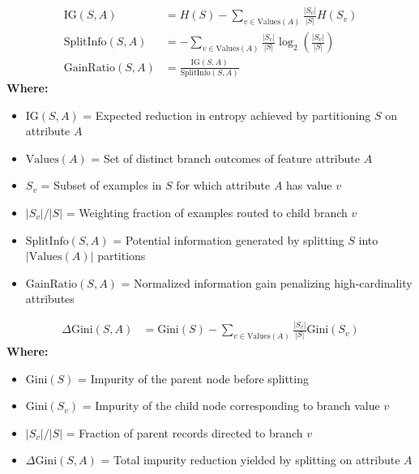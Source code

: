 \begin{formulabox}
\begin{align*}
    \text{IG}(S, A) &= H(S) - \sum_{v \in \text{Values}(A)} \frac{|S_v|}{|S|} H(S_v) \\[2pt]
    \text{SplitInfo}(S, A) &= - \sum_{v \in \text{Values}(A)} \frac{|S_v|}{|S|} \log_2\left(\frac{|S_v|}{|S|}\right) \\[2pt]
    \text{GainRatio}(S, A) &= \frac{\text{IG}(S, A)}{\text{SplitInfo}(S, A)}
\end{align*}
\textbf{Where:}
\begin{itemize}[noitemsep, topsep=1pt]
    \item $\text{IG}(S, A)$ = Expected reduction in entropy achieved by partitioning $S$ on attribute $A$
    \item $\text{Values}(A)$ = Set of distinct branch outcomes of feature attribute $A$
    \item $S_v$ = Subset of examples in $S$ for which attribute $A$ has value $v$
    \item $|S_v| / |S|$ = Weighting fraction of examples routed to child branch $v$
    \item $\text{SplitInfo}(S, A)$ = Potential information generated by splitting $S$ into $| \text{Values}(A) |$ partitions
    \item $\text{GainRatio}(S, A)$ = Normalized information gain penalizing high-cardinality attributes
\end{itemize}
\end{formulabox}

\begin{formulabox}
\begin{align*}
    \Delta\text{Gini}(S, A) &= \text{Gini}(S) - \sum_{v \in \text{Values}(A)} \frac{|S_v|}{|S|} \text{Gini}(S_v)
\end{align*}
\textbf{Where:}
\begin{itemize}[noitemsep, topsep=1pt]
    \item $\text{Gini}(S)$ = Impurity of the parent node before splitting
    \item $\text{Gini}(S_v)$ = Impurity of the child node corresponding to branch value $v$
    \item $|S_v| / |S|$ = Fraction of parent records directed to branch $v$
    \item $\Delta\text{Gini}(S, A)$ = Total impurity reduction yielded by splitting on attribute $A$
\end{itemize}
\end{formulabox}

